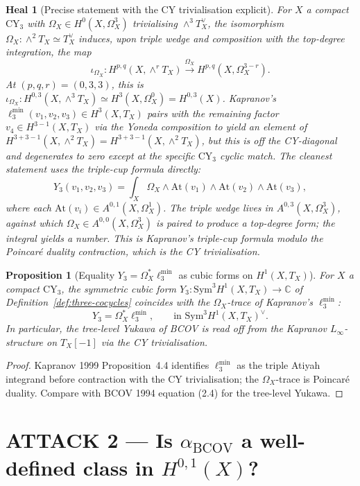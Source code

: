 \documentclass[11pt]{article}
\newtheorem{proposition}[theorem]{Proposition}
\newtheorem{heal}[theorem]{Heal}
\providecommand{\At}{\mathrm{At}}
\providecommand{\CY}{\mathrm{CY}}
\providecommand{\BCOV}{\mathrm{BCOV}}
\providecommand{\Om}{\Omega}
\providecommand{\Sym}{\mathrm{Sym}}
\providecommand{\CC}{\mathbb{C}}
\begin{document}
\begin{heal}[Precise statement with the CY trivialisation explicit]
\label{heal:1}
For $X$ a compact $\CY_3$ with $\Om_X \in H^0(X, \Om^3_X)$ trivialising
$\wedge^3 T_X^\vee$, the isomorphism $\Om_X: \wedge^2 T_X \simeq T_X^\vee$
induces, upon triple wedge and composition with the top-degree
integration, the map
\[
  \iota_{\Om_X} : H^{p,q}(X, \wedge^r T_X) \xrightarrow{\Om_X}
  H^{p, q}(X, \Om^{3-r}_X).
\]
At $(p,q,r) = (0, 3, 3)$, this is $\iota_{\Om_X}: H^{0,3}(X, \wedge^3
T_X) \simeq H^3(X, \Om^0_X) = H^{0,3}(X)$. Kapranov's $\ell_3^{\min}(v_1,
v_2, v_3) \in H^3(X, T_X)$ pairs with the remaining factor $v_4 \in
H^{3-1}(X, T_X)$ via the Yoneda composition to yield an element of
$H^{3+3-1}(X, \wedge^2 T_X) = H^{3+3-1}(X, \wedge^2 T_X)$, but this is
off the CY-diagonal and degenerates to zero except at the specific
$\CY_3$ cyclic match. The cleanest statement uses the triple-cup formula
directly:
\[
  Y_3(v_1, v_2, v_3) = \int_X \Om_X \wedge \At(v_1) \wedge \At(v_2) \wedge
    \At(v_3),
\]
where each $\At(v_i) \in A^{0,1}(X, \Om^1_X)$. The triple wedge lives in
$A^{0,3}(X, \Om^3_X)$, against which $\Om_X \in A^{0,0}(X, \Om^3_X)$ is
paired to produce a top-degree form; the integral yields a number. This
is Kapranov's triple-cup formula modulo the Poincar\'e duality
contraction, which is the CY trivialisation.
\end{heal}

\begin{proposition}[Equality $Y_3 = \Om_X^* \ell_3^{\min}$ as cubic forms on
$H^1(X, T_X)$]
\label{prop:y3-l3-equality}
For $X$ a compact $\CY_3$, the symmetric cubic form $Y_3: \Sym^3 H^1(X,
T_X) \to \CC$ of Definition~\ref{def:three-cocycles} coincides with the
$\Om_X$-trace of Kapranov's $\ell_3^{\min}$:
\[
  Y_3 = \Om_X^* \ell_3^{\min}, \qquad \text{in } \Sym^3 H^1(X, T_X)^\vee.
\]
In particular, the tree-level Yukawa of BCOV is read off from the
Kapranov $L_\infty$-structure on $T_X[-1]$ via the CY trivialisation.
\end{proposition}

\begin{proof}
Kapranov 1999 Proposition~4.4 identifies $\ell_3^{\min}$ as the triple
Atiyah integrand before contraction with the CY trivialisation; the
$\Om_X$-trace is Poincar\'e duality. Compare with BCOV 1994 equation
(2.4) for the tree-level Yukawa.
\end{proof}

\section{ATTACK 2 --- Is $\alpha_\BCOV$ a well-defined class in
$H^{0,1}(X)$?}
\label{sec:attack-2}
\end{document}
